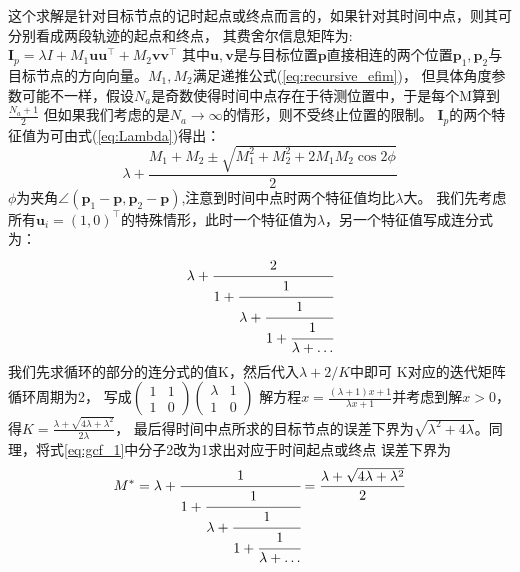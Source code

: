 这个求解是针对目标节点的记时起点或终点而言的，如果针对其时间中点，则其可分别看成两段轨迹的起点和终点，
其费舍尔信息矩阵为:$\bm{I}_p=\lambda I+M_1\bm{u}\bm{u}^\intercal +M_2\bm{v}\bm{v}^\intercal $
其中$\bm{u},\bm{v}$是与目标位置$\bm{p}$直接相连的两个位置$\bm{p}_1,\bm{p}_2$与目标节点的方向向量。$M_1,M_2$满足递推公式(\ref{eq:recursive_efim})，
但具体角度参数可能不一样，假设$N_a$是奇数使得时间中点存在于待测位置中，于是每个M算到$\frac{N_a+1}{2}$
但如果我们考虑的是$N_a\to \infty$的情形，则不受终止位置的限制。
$\bm{I}_p$的两个特征值为可由式(\ref{eq:Lambda})得出：
\[
\lambda+\frac{M_1+M_2\pm \sqrt{M_1^2+M_2^2+2M_1M_2\cos2\phi}}{2}
\]
$\phi$为夹角$\angle(\bm{p}_1-\bm{p},\bm{p}_2-\bm{p})$,注意到时间中点时两个特征值均比$\lambda$大。
我们先考虑所有$\bm{u}_i=(1,0)^\intercal $的特殊情形，此时一个特征值为$\lambda$，另一个特征值写成连分式为：
\begin{equation}\label{eq:gcf_1}
\lambda+\cfrac{2}{1+\cfrac{1}{\lambda+\cfrac{1}{1+\cfrac{1}{\lambda+\dots}}}}
\end{equation}
我们先求循环的部分的连分式的值K，然后代入$\lambda+2/K$中即可
K对应的迭代矩阵循环周期为2，
写成$\begin{pmatrix}1 & 1 \\1 & 0\end{pmatrix}\begin{pmatrix}\lambda & 1 \\1 & 0\end{pmatrix}$
解方程$x=\frac{(\lambda+1)x+1}{\lambda x+1}$并考虑到解$x>0$，得$K=\frac{\lambda+\sqrt{4\lambda+\lambda^2}}{2\lambda}$，
最后得时间中点所求的目标节点的误差下界为$\sqrt{\lambda^2+4\lambda}$。同理，将式\ref{eq:gcf_1}中分子2改为1求出对应于时间起点或终点
误差下界为
\begin{equation}\label{eq:starting_or_ending}
M^*=\lambda+\cfrac{1}{1+\cfrac{1}{\lambda+\cfrac{1}{1+\cfrac{1}{\lambda+\dots}}}}
=\frac{\lambda+\sqrt{4\lambda+\lambda^2}}{2}
\end{equation}


